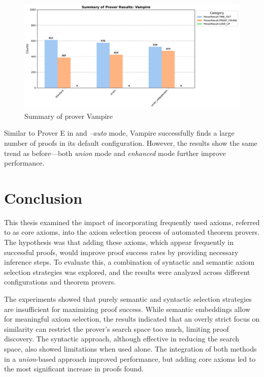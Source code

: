 \documentclass[english,version-2020-11]{uzl-thesis}
\begin{document}
\begin{figure}[h!]
    \centering
    \includegraphics[width=\textwidth]{vampire_mode_output.pdf}
    \caption{Summary of prover Vampire}
    \label{fig:prover_results_vampire}
\end{figure}
\FloatBarrier

Similar to Prover E in  and \textit{--auto} mode, Vampire successfully finds a large number of proofs in its default configuration. However, the results show the same trend as before—both \textit{union} mode and \textit{enhanced} mode further improve performance.
 


\chapter{Conclusion}
\label{chapter-conclusion}
This thesis examined the impact of incorporating frequently used axioms, referred to as core axioms, into the axiom selection process of automated theorem provers. The hypothesis was that adding these axioms, which appear frequently in successful proofs, would improve proof success rates by providing necessary inference steps. To evaluate this, a combination of syntactic and semantic axiom selection strategies was explored, and the results were analyzed across different configurations and theorem provers.

The experiments showed that purely semantic and syntactic selection strategies are insufficient for maximizing proof success. While semantic embeddings allow for meaningful axiom selection, the results indicated that an overly strict focus on similarity can restrict the prover’s search space too much, limiting proof discovery. The syntactic approach, although effective in reducing the search space, also showed limitations when used alone. The integration of both methods in a \textit{union}-based approach improved performance, but adding core axioms led to the most significant increase in proofs found.
\end{document}
